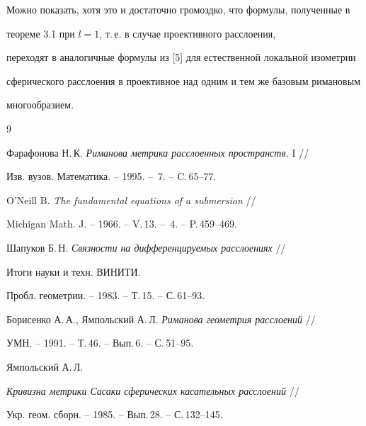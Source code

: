 Можно показать, хотя это и достаточно громоздко, что формулы, полученные в


теореме 3.1 при $l=1$, т.\,е. в случае проективного расслоения,


переходят в аналогичные формулы из [5] для естественной локальной изометрии


сферического расслоения в проективное над одним и тем же базовым римановым


многообразием.





\begin{thebibliography}{9}







Фарафонова Н.\,К. {\em Риманова метрика расслоенных пространств.} I //


Изв. вузов. Математика. -- 1995. -- \No\,7. -- C.\,65--77.




O'Neill B. {\em The fundamental equations of a submersion} //


Michigan Math. J. -- 1966. -- V.\,13. -- \No\,4. -- P.\,459--469.




Шапуков Б.\,Н. {\em Связности на дифференцируемых расслоениях} //


Итоги науки и техн. ВИНИТИ.


Пробл. геометрии. -- 1983. -- Т.\,15. -- С.\,61--93.




Борисенко А.\,А., Ямпольский А.\,Л. {\em Риманова геометрия расслоений} //


УМН. -- 1991. -- Т.\,46. -- Вып.\,6. -- С.\,51--95.




Ямпольский А.\,Л.


{\em Кривизна метрики Сасаки сферических касательных расслоений} //


Укр. геом. сборн. -- 1985. -- Вып.\,28. -- С.\,132--145.





\end{thebibliography}





\vskip 2cm














\label{end}





